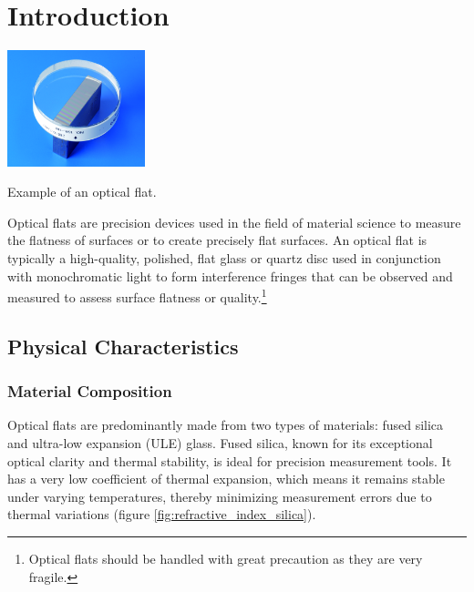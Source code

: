 \documentclass[../main.tex]{subfiles}
\begin{document}
\chapter{Introduction}
\begin{floatingfigure}[r]{0.3\textwidth}%
    \vspace{\dimexpr0.3\baselineskip-\topskip}%
    \noindent
    \includegraphics[width=0.3\textwidth]{Images/Introduction/optical_flat}
    \caption{Example of an optical flat. \cite{optical_flat_mitutoyo}}
    \label{fig:optical_flat_example}
\end{floatingfigure}
Optical flats are precision devices used in the field of material science to measure the flatness of surfaces or to create precisely flat surfaces. An optical flat is typically a high-quality, polished, flat glass or quartz disc used in conjunction with monochromatic light to form interference fringes that can be observed and measured to assess surface flatness or quality.\footnote{Optical flats should be handled with great precaution as they are very fragile.} \cite{Toru_2017, edmund_optics_optical_flats, kemet_optical_flats, lapmaster_wolters_optical_flats,Paschottaoptical_flats}
\section{Physical Characteristics}
\subsection{Material Composition}
Optical flats are predominantly made from two types of materials: fused silica and ultra-low expansion (ULE) glass. Fused silica, known for its exceptional optical clarity and thermal stability, is ideal for precision measurement tools. It has a very low coefficient of thermal expansion, which means it remains stable under varying temperatures, thereby minimizing measurement errors due to thermal variations (figure \ref{fig:refractive_index_silica}).\cite{Paschottafused_silica}
\end{document}
